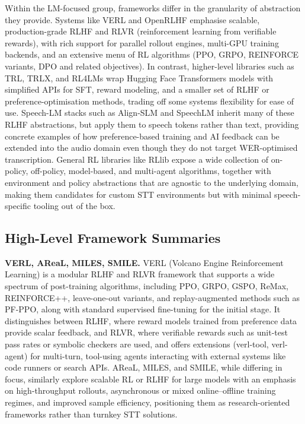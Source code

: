 \documentclass[conference]{IEEEtran}
\begin{document}
Within the LM-focused group, frameworks differ in the granularity of abstraction they provide.
Systems like VERL and OpenRLHF emphasise scalable, production-grade RLHF and RLVR (reinforcement learning from verifiable rewards), with rich support for parallel rollout engines, multi-GPU training backends, and an extensive menu of RL algorithms (PPO, GRPO, REINFORCE variants, DPO and related objectives).
In contrast, higher-level libraries such as TRL, TRLX, and RL4LMs wrap Hugging Face Transformers models with simplified APIs for SFT, reward modeling, and a smaller set of RLHF or preference-optimisation methods, trading off some systems flexibility for ease of use.
Speech-LM stacks such as Align-SLM and SpeechLM inherit many of these RLHF abstractions, but apply them to speech tokens rather than text, providing concrete examples of how preference-based training and AI feedback can be extended into the audio domain even though they do not target WER-optimised transcription.
General RL libraries like RLlib expose a wide collection of on-policy, off-policy, model-based, and multi-agent algorithms, together with environment and policy abstractions that are agnostic to the underlying domain, making them candidates for custom STT environments but with minimal speech-specific tooling out of the box.

\subsection{High-Level Framework Summaries}

\textbf{VERL, AReaL, MILES, SMILE.}
VERL (Volcano Engine Reinforcement Learning) is a modular RLHF and RLVR framework that supports a wide spectrum of post-training algorithms, including PPO, GRPO, GSPO, ReMax, REINFORCE++, leave-one-out variants, and replay-augmented methods such as PF-PPO, along with standard supervised fine-tuning for the initial stage.
It distinguishes between RLHF, where reward models trained from preference data provide scalar feedback, and RLVR, where verifiable rewards such as unit-test pass rates or symbolic checkers are used, and offers extensions (verl-tool, verl-agent) for multi-turn, tool-using agents interacting with external systems like code runners or search APIs.
AReaL, MILES, and SMILE, while differing in focus, similarly explore scalable RL or RLHF for large models with an emphasis on high-throughput rollouts, asynchronous or mixed online–offline training regimes, and improved sample efficiency, positioning them as research-oriented frameworks rather than turnkey STT solutions.
\end{document}
